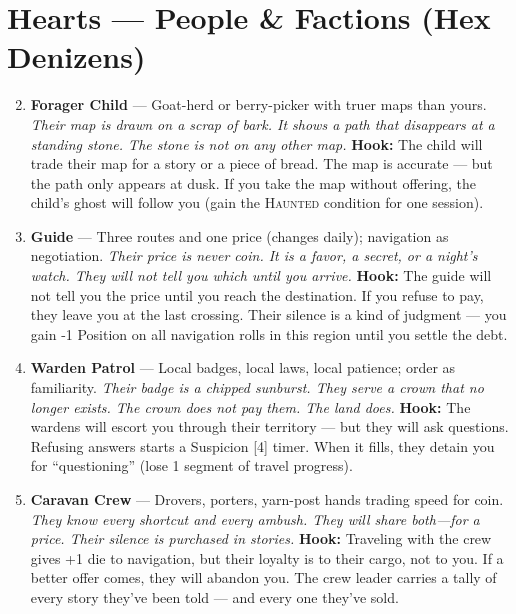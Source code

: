 \section*{Hearts --- People \& Factions (Hex Denizens)}
\label{sec:wilderness-people}
\begin{enumerate}
\setcounter{enumi}{1}
\item \textbf{Forager Child} --- Goat-herd or berry-picker with truer maps than yours.
  \hfill \textit{Their map is drawn on a scrap of bark. It shows a path that disappears at a standing stone. The stone is not on any other map.}
  \textbf{Hook:} The child will trade their map for a story or a piece of bread. The map is accurate --- but the path only appears at dusk. If you take the map without offering, the child's ghost will follow you (gain the \textsc{Haunted} condition for one session).
  
\item \textbf{Guide} --- Three routes and one price (changes daily); navigation as negotiation.
  \hfill \textit{Their price is never coin. It is a favor, a secret, or a night's watch. They will not tell you which until you arrive.}
  \textbf{Hook:} The guide will not tell you the price until you reach the destination. If you refuse to pay, they leave you at the last crossing. Their silence is a kind of judgment --- you gain -1 Position on all navigation rolls in this region until you settle the debt.
  
\item \textbf{Warden Patrol} --- Local badges, local laws, local patience; order as familiarity.
  \hfill \textit{Their badge is a chipped sunburst. They serve a crown that no longer exists. The crown does not pay them. The land does.}
  \textbf{Hook:} The wardens will escort you through their territory --- but they will ask questions. Refusing answers starts a Suspicion [4] timer. When it fills, they detain you for ``questioning'' (lose 1 segment of travel progress).
  
\item \textbf{Caravan Crew} --- Drovers, porters, yarn-post hands trading speed for coin.
  \hfill \textit{They know every shortcut and every ambush. They will share both---for a price. Their silence is purchased in stories.}
  \textbf{Hook:} Traveling with the crew gives +1 die to navigation, but their loyalty is to their cargo, not to you. If a better offer comes, they will abandon you. The crew leader carries a tally of every story they've been told --- and every one they've sold.
  

\end{enumerate}
